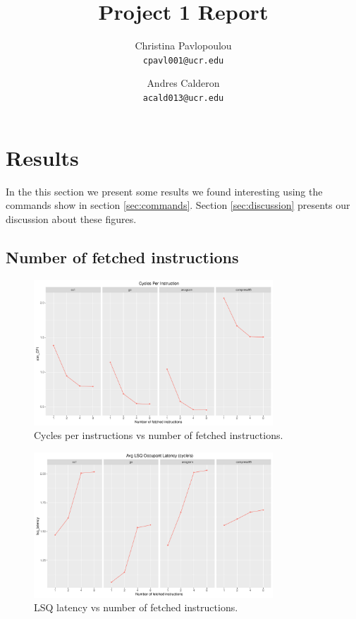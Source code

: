 \documentclass[10pt]{scrartcl}
\title{Project 1 Report}
\author{
   Christina Pavlopoulou\\
  \small \texttt{cpavl001@ucr.edu}
  \and
   Andres Calderon\\
  \small \texttt{acald013@ucr.edu}
}
\begin{document}
\maketitle


\section{Results}\label{sec:results}
In the this section we present some results we found interesting using the commands show in section \ref{sec:commands}.  Section \ref{sec:discussion} presents our discussion about these figures. 

\subsection{Number of fetched instructions}

\begin{figure}[h]
  \centering
  \includegraphics[width=0.8\textwidth]{Plots/plot_F_sim_CPI}
  \caption{Cycles per instructions vs number of fetched instructions.}\label{fig:f_sim_cpi}
\end{figure}

\begin{figure}[h]
  \centering
  \includegraphics[width=0.8\textwidth]{Plots/plot_F_lsq_latency}
  \caption{LSQ latency vs number of fetched instructions.}\label{fig:f_lsq_latency}
\end{figure}
\end{document}
